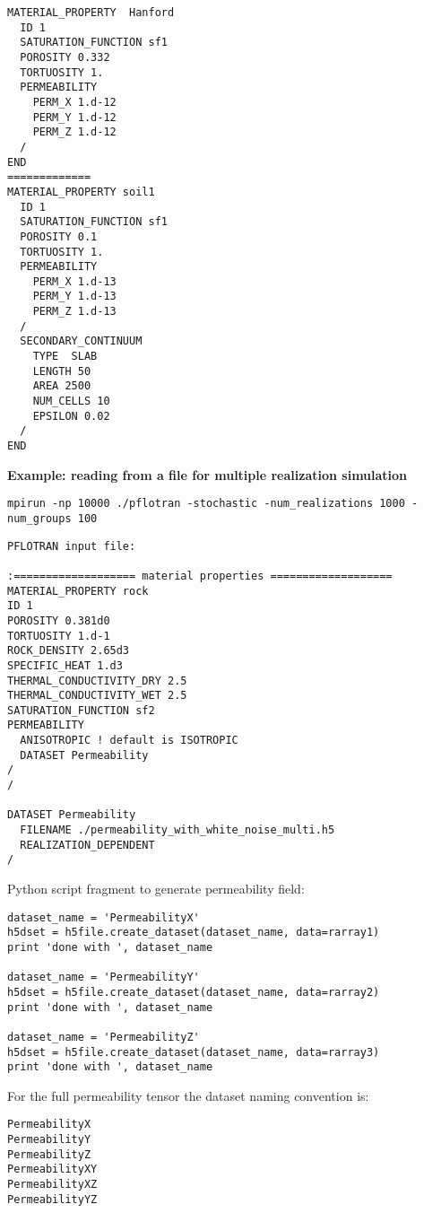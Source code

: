 
\begin{mdframed}

\begin{verbatim}
MATERIAL_PROPERTY  Hanford
  ID 1
  SATURATION_FUNCTION sf1
  POROSITY 0.332
  TORTUOSITY 1.
  PERMEABILITY
    PERM_X 1.d-12
    PERM_Y 1.d-12
    PERM_Z 1.d-12
  /
END
=============
MATERIAL_PROPERTY soil1
  ID 1 
  SATURATION_FUNCTION sf1
  POROSITY 0.1
  TORTUOSITY 1.
  PERMEABILITY
    PERM_X 1.d-13
    PERM_Y 1.d-13
    PERM_Z 1.d-13
  /
  SECONDARY_CONTINUUM
    TYPE  SLAB
    LENGTH 50
    AREA 2500
    NUM_CELLS 10
    EPSILON 0.02
  /
END
\end{verbatim}

\noindent
{\bf Example: reading from a file for multiple realization simulation}

{\scriptsize\tt mpirun -np 10000 ./pflotran -stochastic -num\_realizations 1000 -num\_groups 100}

\begin{verbatim}
PFLOTRAN input file:

:=================== material properties ===================
MATERIAL_PROPERTY rock
ID 1
POROSITY 0.381d0
TORTUOSITY 1.d-1
ROCK_DENSITY 2.65d3
SPECIFIC_HEAT 1.d3
THERMAL_CONDUCTIVITY_DRY 2.5
THERMAL_CONDUCTIVITY_WET 2.5 
SATURATION_FUNCTION sf2
PERMEABILITY
  ANISOTROPIC ! default is ISOTROPIC
  DATASET Permeability
/
/

DATASET Permeability
  FILENAME ./permeability_with_white_noise_multi.h5
  REALIZATION_DEPENDENT
/

\end{verbatim}
\noindent
Python script fragment to generate permeability field:
\begin{Verbatim}
dataset_name = 'PermeabilityX'
h5dset = h5file.create_dataset(dataset_name, data=rarray1)
print 'done with ', dataset_name

dataset_name = 'PermeabilityY'
h5dset = h5file.create_dataset(dataset_name, data=rarray2)
print 'done with ', dataset_name

dataset_name = 'PermeabilityZ'
h5dset = h5file.create_dataset(dataset_name, data=rarray3)
print 'done with ', dataset_name
\end{Verbatim}

\noindent
For the full permeability tensor the dataset naming convention is:
\begin{Verbatim}
PermeabilityX
PermeabilityY
PermeabilityZ
PermeabilityXY
PermeabilityXZ
PermeabilityYZ
\end{Verbatim}

\end{mdframed}

